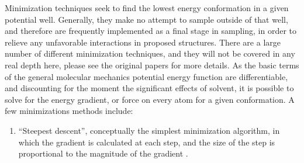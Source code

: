 Minimization techniques seek to find the lowest energy conformation in a given potential well.
Generally, they make no attempt to sample outside of that well, and therefore are frequently implemented as a final stage in sampling, in order to relieve any unfavorable interactions in proposed structures.
There are a large number of different minimization techniques, and they will not be covered in any real depth here, please see the original papers for more details.
As the basic terms of the general molecular mechanics potential energy function are differentiable, and discounting for the moment the significant effects of solvent, it is possible to solve for the energy gradient, or force on every atom for a given conformation. 
A few minimizations methods include:
\begin{enumerate}
\item ``Steepest descent'', conceptually the simplest minimization algorithm, in which the gradient is calculated at each step, and the size of the step is proportional to the magnitude of the gradient \cite{levitt1969refinement,bixon1967potential}.
\end{enumerate}


